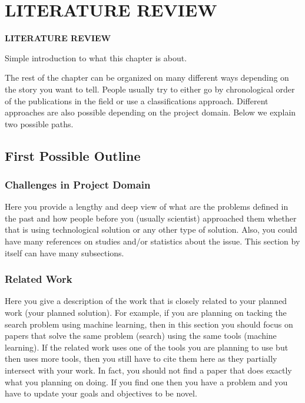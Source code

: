 \chapter{LITERATURE REVIEW}
\pagebreak

\begin{center}
{\LARGE\textbf{LITERATURE REVIEW}}
\end{center}

Simple introduction to what this chapter is about.

The rest of the chapter can be organized on many different ways depending on the story you want to tell. People usually try to either go by chronological order of the publications in the field or use a classifications approach. Different approaches are also possible depending on the project domain. Below we explain two possible paths.

\section{First Possible Outline}
\label{sec:first_possible_outline}

\subsection{Challenges in Project Domain} %
\label{sub:challenges_in_project_domain}

Here you provide a lengthy and deep view of what are the problems defined in the past and how people before you (usually scientist) approached them whether that is using technological solution or any other type of solution. Also, you could have many references on studies and/or statistics about the issue. This section by itself can have many subsections.

\subsection{Related Work}
\label{sub:related_work1}

Here you give a description of the work that is closely related to your planned work (your planned solution). For example, if you are planning on tacking the search problem using machine learning, then in this section you should focus on papers that solve the same problem (search) using the same tools (machine learning). If the related work uses one of the tools you are planning to use but then uses more tools, then you still have to cite them here as they partially intersect with your work. In fact, you should not find a paper that does exactly what you planning on doing. If you find one then you have a problem and you have to update your goals and objectives to be novel. 


